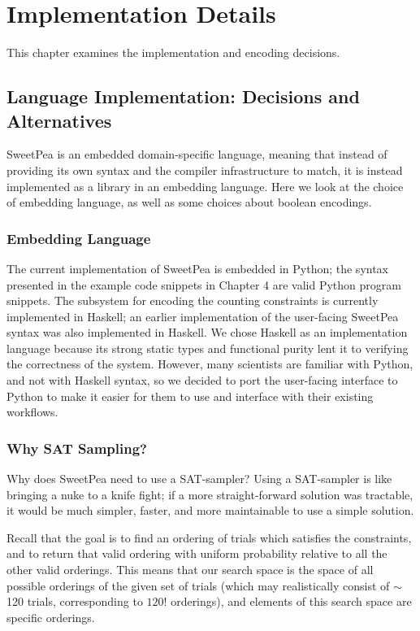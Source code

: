 
\chapter{Implementation Details}

This chapter examines the implementation and encoding decisions.

\section{Language Implementation: Decisions and Alternatives}

SweetPea is an embedded domain-specific language, meaning that instead of providing its own syntax and the compiler infrastructure to match, it is instead implemented as a library in an embedding language. Here we look at the choice of embedding language, as well as some choices about boolean encodings.

\subsection{Embedding Language}

The current implementation of SweetPea is embedded in Python; the syntax presented in the example code snippets in Chapter 4 are valid Python program snippets. The subsystem for encoding the counting constraints is currently implemented in Haskell; an earlier implementation of the user-facing SweetPea syntax was also implemented in Haskell. We chose Haskell as an implementation language because its strong static types and functional purity lent it to verifying the correctness of the system. However, many scientists are familiar with Python, and not with Haskell syntax, so we decided to port the user-facing interface to Python to make it easier for them to use and interface with their existing workflows.

\subsection{Why SAT Sampling?}

Why does SweetPea need to use a SAT-sampler? Using a SAT-sampler is like bringing a nuke to a knife fight; if a more straight-forward solution was tractable, it would be much simpler, faster, and more maintainable to use a simple solution.

Recall that the goal is to find an ordering of trials which satisfies the constraints, and to return that valid ordering with uniform probability relative to all the other valid orderings. This means that our search space is the space of all possible orderings of the given set of trials (which may realistically consist of $\sim$120 trials, corresponding to $120!$ orderings), and elements of this search space are specific orderings.

